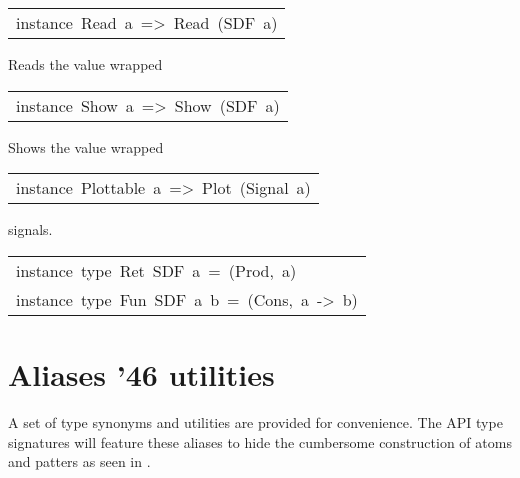 \begin{haddockdesc}
\item[\begin{tabular}{@{}l}
instance\ Read\ a\ =>\ Read\ (SDF\ a)
\end{tabular}]\haddockbegindoc
Reads the value wrapped\par

\end{haddockdesc}
\begin{haddockdesc}
\item[\begin{tabular}{@{}l}
instance\ Show\ a\ =>\ Show\ (SDF\ a)
\end{tabular}]\haddockbegindoc
Shows the value wrapped\par

\end{haddockdesc}
\begin{haddockdesc}
\item[\begin{tabular}{@{}l}
instance\ Plottable\ a\ =>\ Plot\ (Signal\ a)
\end{tabular}]\haddockbegindoc
{} signals.\par

\end{haddockdesc}
\begin{haddockdesc}
\item[\begin{tabular}{@{}l}
instance\ type\ Ret\ SDF\ a\ =\ (Prod,\ {\char 91}a{\char 93})\\instance\ type\ Fun\ SDF\ a\ b\ =\ (Cons,\ {\char 91}a{\char 93}\ ->\ b)
\end{tabular}]
\end{haddockdesc}
\section{Aliases {\char '46} utilities}
A set of type synonyms and utilities are provided for
 convenience. The API type signatures will feature these aliases
 to hide the cumbersome construction of atoms and patters as seen
 in .\par

